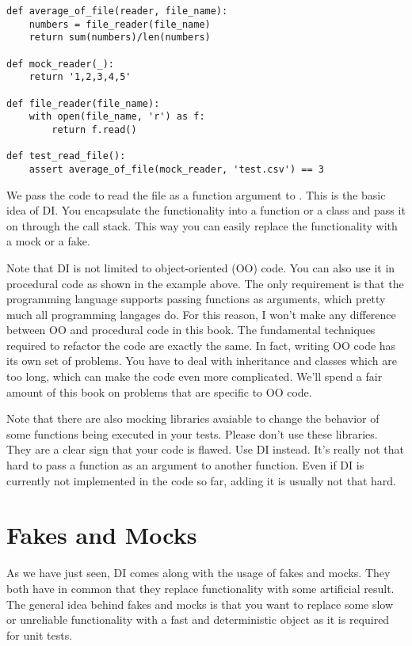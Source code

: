 \begin{programcode}{}\label{prog:mock_reader}
\begin{verbatim}
def average_of_file(reader, file_name):
    numbers = file_reader(file_name)
    return sum(numbers)/len(numbers)

def mock_reader(_):
    return '1,2,3,4,5'

def file_reader(file_name):
    with open(file_name, 'r') as f:
        return f.read()

def test_read_file():
    assert average_of_file(mock_reader, 'test.csv') == 3
\end{verbatim}
\end{programcode}

We pass the code to read the file as a function argument to . This is the basic idea of DI. You encapsulate the functionality into a function or a class and pass it on through the call stack. This way you can easily replace the functionality with a mock or a fake.

Note that DI is not limited to object-oriented (OO) code. You can also use it in procedural code as shown in the example above. The only requirement is that the programming language supports passing functions as arguments, which pretty much all programming langages do. For this reason, I won't make any difference between OO and procedural code in this book. The fundamental techniques required to refactor the code are exactly the same. In fact, writing OO code has its own set of problems. You have to deal with inheritance and classes which are too long, which can make the code even more complicated. We'll spend a fair amount of this book on problems that are specific to OO code.

Note that there are also mocking libraries avaiable to change the behavior of some functions being executed in your tests. Please don't use these libraries. They are a clear sign that your code is flawed. Use DI instead. It's really not that hard to pass a function as an argument to another function. Even if DI is currently not implemented in the code so far, adding it is usually not that hard.

\section{Fakes and Mocks}

As we have just seen, DI comes along with the usage of fakes and mocks. They both have in common that they replace functionality with some artificial result. The general idea behind fakes and mocks is that you want to replace some slow or unreliable functionality with a fast and deterministic object as it is required for unit tests.

